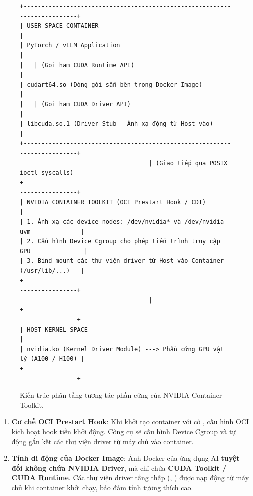 \begin{figure}[ht]
\centering
\footnotesize
\begin{verbatim}
+--------------------------------------------------------------------------+
| USER-SPACE CONTAINER                                                     |
| PyTorch / vLLM Application                                               |
|   | (Goi ham CUDA Runtime API)                                           |
| cudart64.so (Dóng gói sẵn bên trong Docker Image)                        |
|   | (Goi ham CUDA Driver API)                                            |
| libcuda.so.1 (Driver Stub - Ánh xạ động từ Host vào)                     |
+--------------------------------------------------------------------------+
                                    | (Giao tiếp qua POSIX ioctl syscalls)
+--------------------------------------------------------------------------+
| NVIDIA CONTAINER TOOLKIT (OCI Prestart Hook / CDI)                       |
| 1. Ánh xạ các device nodes: /dev/nvidia* và /dev/nvidia-uvm              |
| 2. Cấu hình Device Cgroup cho phép tiến trình truy cập GPU               |
| 3. Bind-mount các thư viện driver từ Host vào Container (/usr/lib/...)   |
+--------------------------------------------------------------------------+
                                    |
+--------------------------------------------------------------------------+
| HOST KERNEL SPACE                                                        |
| nvidia.ko (Kernel Driver Module) ---> Phần cứng GPU vật lý (A100 / H100) |
+--------------------------------------------------------------------------+
\end{verbatim}
\caption{Kiến trúc phân tầng tương tác phần cứng của NVIDIA Container Toolkit.}
\label{fig:nvidia-toolkit-architecture}
\end{figure}

\begin{enumerate}
  \item \textbf{Cơ chế OCI Prestart Hook}: Khi khởi tạo container với cờ , cấu hình OCI kích hoạt hook tiền khởi động. Công cụ  sẽ cấu hình Device Cgroup và tự động gắn kết các thư viện driver từ máy chủ vào container.
  \item \textbf{Tính di động của Docker Image}: Ảnh Docker của ứng dụng AI \textbf{tuyệt đối không chứa NVIDIA Driver}, mà chỉ chứa \textbf{CUDA Toolkit / CUDA Runtime}. Các thư viện driver tầng thấp (, ) được nạp động từ máy chủ khi container khởi chạy, bảo đảm tính tương thích cao.
\end{enumerate}

